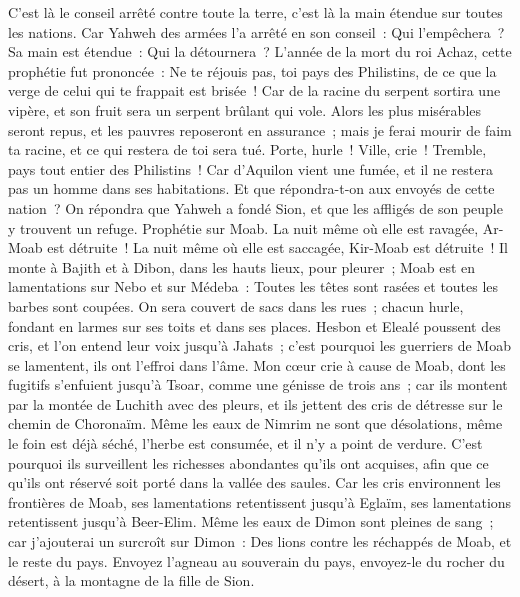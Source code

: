 \begin{multicols}{2}
C'est là le conseil arrêté contre toute la terre, c'est là la main étendue sur toutes les nations.
Car Yahweh des armées l'a arrêté en son conseil~: Qui l'empêchera~? Sa main est étendue~: Qui la détournera~?
L'année de la mort du roi Achaz, cette prophétie fut prononcée~:
Ne te réjouis pas, toi pays des Philistins, de ce que la verge de celui qui te frappait est brisée~! Car de la racine du serpent sortira une vipère, et son fruit sera un serpent brûlant qui vole.
Alors les plus misérables seront repus, et les pauvres reposeront en assurance~; mais je ferai mourir de faim ta racine, et ce qui restera de toi sera tué.
Porte, hurle~! Ville, crie~! Tremble, pays tout entier des Philistins~! Car d'Aquilon vient une fumée, et il ne restera pas un homme dans ses habitations.
Et que répondra-t-on aux envoyés de cette nation~? On répondra que Yahweh a fondé Sion, et que les affligés de son peuple y trouvent un refuge.
\VerseOne{}Prophétie sur Moab. La nuit même où elle est ravagée, Ar-Moab est détruite~! La nuit même où elle est saccagée, Kir-Moab est détruite~!
Il monte à Bajith et à Dibon, dans les hauts lieux, pour pleurer~; Moab est en lamentations sur Nebo et sur Médeba~: Toutes les têtes sont rasées et toutes les barbes sont coupées.
On sera couvert de sacs dans les rues~; chacun hurle, fondant en larmes sur ses toits et dans ses places.
Hesbon et Elealé poussent des cris, et l'on entend leur voix jusqu'à Jahats~; c'est pourquoi les guerriers de Moab se lamentent, ils ont l'effroi dans l'âme.
Mon cœur crie à cause de Moab, dont les fugitifs s'enfuient jusqu'à Tsoar, comme une génisse de trois ans~; car ils montent par la montée de Luchith avec des pleurs, et ils jettent des cris de détresse sur le chemin de Choronaïm.
Même les eaux de Nimrim ne sont que désolations, même le foin est déjà séché, l'herbe est consumée, et il n'y a point de verdure.
C'est pourquoi ils surveillent les richesses abondantes qu'ils ont acquises, afin que ce qu'ils ont réservé soit porté dans la vallée des saules.
Car les cris environnent les frontières de Moab, ses lamentations retentissent jusqu'à Eglaïm, ses lamentations retentissent jusqu'à Beer-Elim.
Même les eaux de Dimon sont pleines de sang~; car j'ajouterai un surcroît sur Dimon~: Des lions contre les réchappés de Moab, et le reste du pays.
\VerseOne{}Envoyez l'agneau au souverain du pays, envoyez-le du rocher du désert, à la montagne de la fille de Sion.

\end{multicols}
